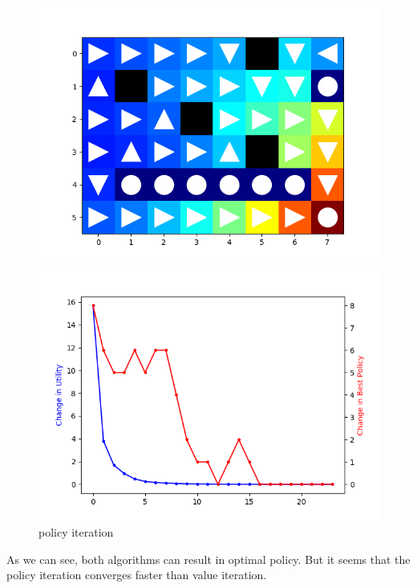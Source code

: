 \documentclass[aps,letterpaper,10pt]{revtex4}
\begin{document}
\begin{figure}[htbp] 
    \centering 
    \begin{minipage}[t]{0.5\linewidth}
    \centering 
    \includegraphics[scale=0.5]{Policy.png} 
    \end{minipage}%
    \begin{minipage}[t]{0.5\linewidth} 
    \centering 
    \includegraphics[scale=0.5]{Policy_change.png} 
    \end{minipage}%
    \centering 
    \caption{policy iteration} 
\end{figure}
\par
  As we can see, both algorithms can result in optimal policy.
  But it seems that the policy iteration converges faster than 
  value iteration.
\newpage
\end{document}
